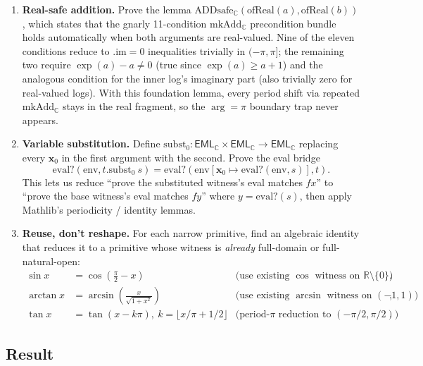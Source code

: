 \documentclass[11pt,a4paper]{article}
\newcommand{\EMLC}{\mathsf{EML}_{\mathbb{C}}}
\newcommand{\EsetC}{\EMLC}
\theoremstyle{plain}
\theoremstyle{definition}
\begin{document}
\begin{enumerate}[topsep=2pt, itemsep=4pt]
\item \textbf{Real-safe addition.} Prove the lemma
$\mathrm{ADDsafe}_{\mathbb{C}}(\mathrm{ofReal}(a), \mathrm{ofReal}(b))$,
which states that the gnarly 11-condition $\mathrm{mkAdd}_{\mathbb{C}}$
precondition bundle holds automatically when both arguments are
real-valued. Nine of the eleven conditions reduce to $.\mathrm{im} = 0$
inequalities trivially in $(-\pi, \pi]$; the remaining two require
$\exp(a) - a \neq 0$ (true since $\exp(a) \geq a + 1$) and the
analogous condition for the inner log's imaginary part (also trivially
zero for real-valued logs). With this foundation lemma, every period
shift via repeated $\mathrm{mkAdd}_{\mathbb{C}}$ stays in the real
fragment, so the $\arg = \pi$ boundary trap never appears.

\item \textbf{Variable substitution.} Define
$\mathrm{subst}_0 : \EsetC \times \EsetC \to \EsetC$ replacing every
$\mathbf{x}_0$ in the first argument with the second. Prove the eval
bridge
\begin{equation}
    \mathrm{eval?}(\mathrm{env}, t.\mathrm{subst}_0\ s)
    = \mathrm{eval?}(\mathrm{env}[\mathbf{x}_0 \mapsto
    \mathrm{eval?}(\mathrm{env}, s)], t).
\end{equation}
This lets us reduce ``prove the substituted witness's eval matches
$f x$'' to ``prove the base witness's eval matches $f y$'' where
$y = \mathrm{eval?}(s)$, then apply Mathlib's periodicity / identity
lemmas.

\item \textbf{Reuse, don't reshape.} For each narrow primitive, find
an algebraic identity that reduces it to a primitive whose witness is
\emph{already} full-domain or full-natural-open:
\begin{align}
    \sin x &= \cos\!\left(\tfrac{\pi}{2} - x\right)
        & \text{(use existing $\cos$ witness on $\mathbb{R}\setminus\{0\}$)}, \\
    \arctan x &= \arcsin\!\left(\frac{x}{\sqrt{1+x^2}}\right)
        & \text{(use existing $\arcsin$ witness on $(-1, 1)$)}, \\
    \tan x &= \tan(x - k\pi),\ k = \lfloor x/\pi + 1/2 \rfloor
        & \text{(period-$\pi$ reduction to $(-\pi/2, \pi/2)$)}.
\end{align}
\end{enumerate}

\subsection{Result}
\end{document}
